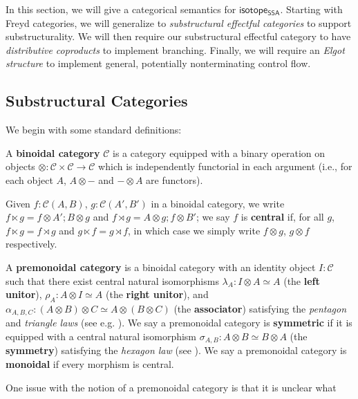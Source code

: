 \documentclass[acmsmall,screen,review]{acmart}
\newcommand{\mc}[1]{\ensuremath{\mathcal{#1}}}
\newcommand{\ms}[1]{\ensuremath{\mathsf{#1}}}
\newcommand{\isotopessa}{\ms{isotope_{SSA}}}
\begin{document}
\label{sec:semantics}

In this section, we will give a categorical semantics for \isotopessa. Starting
with Freyd categories, we will generalize to \textit{substructural effectful
categories} to support substructurality. We will then require our substructural
effectful category to have \textit{distributive coproducts} to implement
branching. Finally, we will require an \textit{Elgot structure} to implement
general, potentially nonterminating control flow.

\subsection{Substructural Categories}

We begin with some standard definitions:
\begin{definition} 
  A \textbf{binoidal category} \(\mc{C}\) is a category equipped with a binary
  operation on objects \(\otimes: \mc{C} \times \mc{C} \to \mc{C}\) which is
  independently functorial in each argument (i.e., for each object \(A\), \(A
  \otimes -\) and \(- \otimes A\) are functors).
\end{definition}
Given \(f: \mc{C}(A, B)\), \(g: \mc{C}(A', B')\) in a binoidal category, we
write \(f \ltimes g = f \otimes A';B \otimes g\) and \(f \rtimes g = A \otimes
g;f \otimes B'\); we say \(f\) is \textbf{central} if, for all \(g\), \(f
\ltimes g = f \rtimes g\) and \(g \ltimes f = g \rtimes f\), in which case we
simply write \(f \otimes g\), \(g \otimes f\) respectively.
\begin{definition} 
  A \textbf{premonoidal category} is a binoidal category with an identity object
  \(I: \mc{C}\) such that there exist central natural isomorphisms \(\lambda_A:
  I \otimes A \simeq A\) (the \textbf{left unitor}), \(\rho_A: A \otimes I
  \simeq A\) (the \textbf{right unitor}), and \(\alpha_{A, B, C}: (A \otimes B)
  \otimes C \simeq A \otimes (B \otimes C)\) (the \textbf{associator})
  satisfying the \textit{pentagon} and \textit{triangle laws} (see e.g.
  \citet{maclane:71}). We say a premonoidal category is \textbf{symmetric} if it
  is equipped with a central natural isomorphism \(\sigma_{A, B}: A \otimes B
  \simeq B \otimes A\) (the \textbf{symmetry}) satisfying the \textit{hexagon
  law} (see \cite{maclane:71}). We say a premonoidal category is
  \textbf{monoidal} if every morphism is central.
\end{definition}
One issue with the notion of a premonoidal category is that it is unclear what
\end{document}
